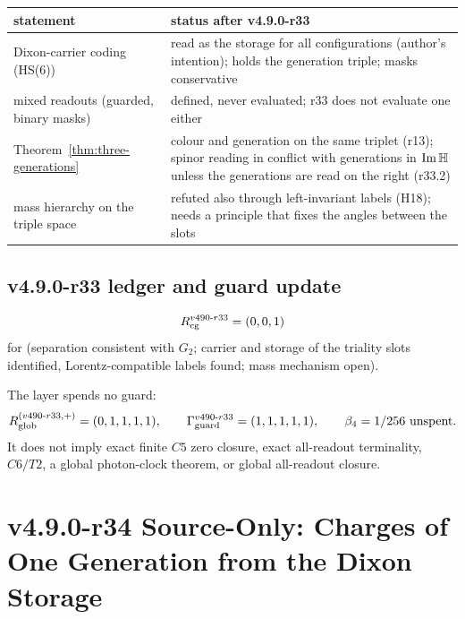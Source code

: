 \begin{center}
\small
\begin{tabular}{@{}>{\raggedright\arraybackslash}p{}>{\raggedright\arraybackslash}p{}@{}}
\toprule
statement & status after v4.9.0-r33\\
\midrule
Dixon-carrier coding (HS(6)) & read as the storage for all configurations (author's intention); holds the generation triple; masks conservative\\
mixed readouts (guarded, binary masks) & defined, never evaluated; r33 does not evaluate one either\\
Theorem~\ref{thm:three-generations} & colour and generation on the same triplet (r13); spinor reading in conflict with generations in \(\operatorname{Im}\mathbb{H}\) unless the generations are read on the right (r33.2)\\
mass hierarchy on the triple space & refuted also through left-invariant labels (H18); needs a principle that fixes the angles between the slots\\
\bottomrule
\end{tabular}
\end{center}

\subsection*{v4.9.0-r33 ledger and guard update}
\label{subsec:v490-r33-ledger-guard}

\[
R_{\rm cg}^{v490\text{-}r33}=(0,0,1)
\]
for (separation consistent with \(G_2\); carrier and storage of the triality slots identified, Lorentz-compatible labels found;
mass mechanism open).

The layer spends no guard:
\[
R_{\rm glob}^{(v490\text{-}r33,+)}=(0,1,1,1,1),
\qquad
\Gamma_{\rm guard}^{v490\text{-}r33}=(1,1,1,1,1),
\qquad
\beta_4=1/256\ \text{unspent}.
\]
It does not imply exact finite \(C5\) zero closure, exact all-readout terminality,
\(C6/T2\), a global photon-clock theorem, or global all-readout closure.
\clearpage
\section*{v4.9.0-r34 Source-Only: Charges of One Generation from the Dixon Storage}
\label{sec:v490-r34-charges-dixon}

